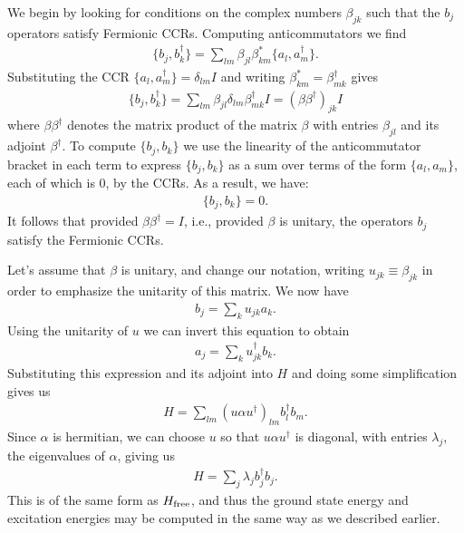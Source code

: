 \documentclass[12pt]{article}
\begin{document}
We begin by looking for conditions on the complex numbers $\beta_{jk}$
such that the $b_j$ operators satisfy Fermionic CCRs.  Computing
anticommutators we find
\begin{eqnarray}
  \{ b_j, b_k^\dagger \} = \sum_{lm} \beta_{jl} \beta_{km}^* \{ a_l,a_m^\dagger \}.
\end{eqnarray}
Substituting the CCR $\{ a_l,a_m^\dagger \} = \delta_{lm} I$ and
writing $\beta_{km}^* = \beta_{mk}^\dagger$ gives
\begin{eqnarray}
  \{ b_j, b_k^\dagger \} = \sum_{lm} \beta_{jl} \delta_{lm} \beta_{mk}^\dagger I= (\beta \beta^\dagger)_{jk} I
\end{eqnarray}
where $\beta \beta^\dagger$ denotes the matrix product of the matrix
$\beta$ with entries $\beta_{jl}$ and its adjoint $\beta^\dagger$. To
compute $\{b_j,b_k\}$ we use the linearity of the anticommutator
bracket in each term to express $\{b_j,b_k\}$ as a sum over terms of
the form $\{ a_l,a_m \}$, each of which is $0$, by the CCRs.  As a
result, we have:
\begin{eqnarray}
  \{ b_j,b_k \} = 0.
\end{eqnarray}
It follows that provided $\beta \beta^\dagger = I$, i.e., provided
$\beta$ is unitary, the operators $b_j$ satisfy the Fermionic CCRs.

Let's assume that $\beta$ is unitary, and change our notation, writing
$u_{jk} \equiv \beta_{jk}$ in order to emphasize the unitarity of this
matrix.  We now have
\begin{eqnarray}
  b_j = \sum_k u_{jk} a_k.
\end{eqnarray}
Using the unitarity of $u$ we can invert this equation to obtain
\begin{eqnarray}
  a_j = \sum_k u^\dagger_{jk} b_k.
\end{eqnarray}
Substituting this expression and its adjoint into $H$ and doing some
simplification gives us
\begin{eqnarray}
  H = \sum_{lm} (u \alpha u^\dagger)_{lm} b_l^\dagger b_m.
\end{eqnarray}
Since $\alpha$ is hermitian, we can choose $u$ so that $u \alpha
u^\dagger$ is diagonal, with entries $\lambda_j$, the eigenvalues of
$\alpha$, giving us
\begin{eqnarray}
  H = \sum_j \lambda_j b_j^\dagger b_j.
\end{eqnarray}
This is of the same form as $H_{\rm free}$, and thus the ground state
energy and excitation energies may be computed in the same way as we
described earlier.
\end{document}
